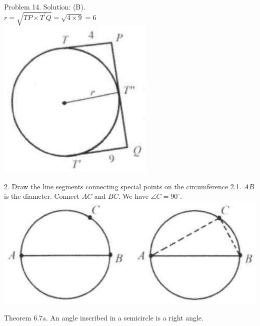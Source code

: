\documentclass[10pt]{article}
\begin{document}
Problem 14. Solution: (B).\\
\(r=\sqrt{T P \times T^{\prime} Q}=\sqrt{4 \times 9}=6\)\\
\includegraphics[max width=\textwidth, center]{2025_04_17_97bc1f7e44d93c271a88g-161}


2. Draw the line segments connecting special points on the circumference
2.1. \(A B\) is the diameter. Connect \(A C\) and \(B C\). We have \(\angle C=90^{\circ}\).\\
\includegraphics[max width=\textwidth, center]{2025_04_17_97bc1f7e44d93c271a88g-162(1)}

Theorem 6.7a. An angle inscribed in a semicircle is a right angle.
\end{document}
